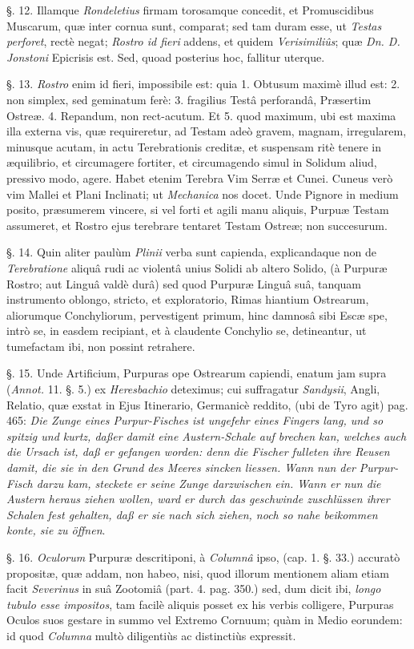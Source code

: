 \documentclass[a4paper, 11pt, oneside, polutonikogreek, german]{article}
\begin{document}
§. 12. Illamque \emph{Rondeletius} firmam torosamque concedit, et Promuscidibus Muscarum, quæ inter cornua sunt, comparat; sed tam duram esse, ut \emph{Testas perforet}, rectè negat; \emph{Rostro id fieri} addens, et quidem \emph{Verisimiliûs}; quæ \emph{Dn. D. Jonstoni} Epicrisis est. Sed, quoad posterius hoc, fallitur uterque.

§. 13. \emph{Rostro} enim id fieri, impossibile est: quia 1. Obtusum maximè illud est: 2. non simplex, sed geminatum ferè: 3. fragilius Testâ perforandâ, Præsertim Ostreæ. 4. Repandum, non rect-acutum. Et 5. quod maximum, ubi est maxima illa externa vis, quæ requireretur, ad Testam adeò gravem, magnam, irregularem, minusque acutam, in actu Terebrationis creditæ, et suspensam ritè tenere in æquilibrio, et circumagere fortiter, et circumagendo simul in Solidum aliud, pressivo modo, agere. Habet etenim Terebra Vim Serræ et Cunei. Cuneus verò vim Mallei et Plani Inclinati; ut \emph{Mechanica} nos docet. Unde Pignore in medium posito, præsumerem vincere, si vel forti et agili manu aliquis, Purpuæ Testam assumeret, et Rostro ejus terebrare tentaret Testam Ostreæ; non succesurum.

§. 14. Quin aliter paulùm \emph{Plinii} verba sunt capienda, explicandaque non de \emph{Terebratione} aliquâ rudi ac violentâ unius Solidi ab altero Solido, (à Purpuræ Rostro; aut Linguâ valdè durâ) sed quod Purpuræ Linguâ suâ, tanquam instrumento oblongo, stricto, et exploratorio, Rimas hiantium Ostrearum, aliorumque Conchyliorum, pervestigent primum, hinc damnosâ sibi Escæ spe, intrò se, in easdem recipiant, et à claudente Conchylio se, detineantur, ut tumefactam ibi, non possint retrahere.

§. 15. Unde Artificium, Purpuras ope Ostrearum capiendi, enatum jam supra (\emph{Annot.} 11. §. 5.) ex \emph{Heresbachio} deteximus; cui suffragatur \emph{Sandysii}, Angli, Relatio, quæ exstat in Ejus Itinerario, Germanicè reddito, (ubi de Tyro agit) pag. 465: \emph{Die Zunge eines Purpur-Fisches ist ungefehr eines Fingers lang, und so spitzig und kurtz, daßer damit eine Austern-Schale auf brechen kan, welches auch die Ursach ist, daß er gefangen worden: denn die Fischer fulleten ihre Reusen damit, die sie in den Grund des Meeres sincken liessen. Wann nun der Purpur-Fisch darzu kam, steckete er seine Zunge darzwischen ein. Wann er nun die Austern heraus ziehen wollen, ward er durch das geschwinde zuschlüssen ihrer Schalen fest gehalten, daß er sie nach sich ziehen, noch so nahe beikommen konte, sie zu öffnen}.

§. 16. \emph{Oculorum} Purpuræ descritiponi, à \emph{Columnâ} ipso, (cap. 1. §. 33.) accuratò propositæ, quæ addam, non habeo, nisi, quod illorum mentionem aliam etiam facit \emph{Severinus} in suâ Zootomiâ (part. 4. pag. 350.) sed, dum dicit ibi, \emph{longo tubulo esse impositos}, tam facilè aliquis posset ex his verbis colligere, Purpuras Oculos suos gestare in summo vel Extremo Cornuum; quàm in Medio eorundem: id quod \emph{Columna} multò diligentiùs ac distinctiùs expressit.
\end{document}
